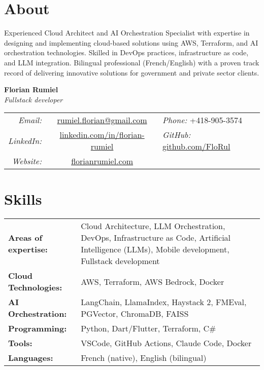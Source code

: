 ﻿\documentclass[11pt,letterpaper]{article}
\begin{document}
\section*{About}
Experienced Cloud Architect and AI Orchestration Specialist with expertise in designing and implementing cloud-based solutions using AWS, Terraform, and AI orchestration technologies.
Skilled in DevOps practices, infrastructure as code, and LLM integration. Bilingual professional (French/English) with a proven track record of delivering innovative solutions for government and private sector clients.
\begin{center}
  {\LARGE\textbf{Florian Rumiel}} \\[0.3em]
  {\large\textit{Fullstack developer}} \\[0.5em]
  \begin{tabular}{r c l}
    \textit{Email:} & \href{mailto:rumiel.florian@gmail.com}{rumiel.florian@gmail.com} & \textit{Phone:} +418-905-3574 \\
    \textit{LinkedIn:} & \href{https://linkedin.com/in/florian-rumiel}{linkedin.com/in/florian-rumiel} & \textit{GitHub:} \href{https://github.com/FloRul}{github.com/FloRul} \\
    \textit{Website:} & \href{https://florian-rumiel.com}{florianrumiel.com} \\
  \end{tabular}
\end{center}

\section*{Skills}
\begin{tabularx}{\textwidth}{@{}l X@{}}
\textbf{Areas of expertise:} & Cloud Architecture, LLM Orchestration, DevOps, Infrastructure as Code, Artificial Intelligence (LLMs), Mobile development, Fullstack development \\[0.2em]
\textbf{Cloud Technologies:} & AWS, Terraform, AWS Bedrock, Docker \\[0.2em]
\textbf{AI Orchestration:} & LangChain, LlamaIndex, Haystack 2, FMEval, PGVector, ChromaDB, FAISS \\[0.2em]
\textbf{Programming:} & Python, Dart/Flutter, Terraform, C\# \\[0.2em]
\textbf{Tools:} & VSCode, GitHub Actions, Claude Code, Docker \\[0.2em]
\textbf{Languages:} & French (native), English (bilingual) \\
\end{tabularx}
\end{document}
